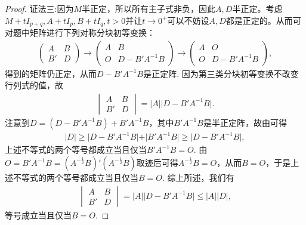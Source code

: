 \documentclass[../../main.tex]{subfiles}%
\begin{document}
\begin{proof}
{\color{blue}证法三:}因为$M$半正定，所以所有主子式非负，因此$A,D$半正定。考虑$M + tI_{p+q}, A + tI_p, B + tI_q, t > 0$并让$t \to 0^+$可以不妨设$A,D$都是正定的。从而可对题中矩阵进行下列对称分块初等变换：
\begin{align*}
\begin{pmatrix}A&B\\B'&D\end{pmatrix}\to\begin{pmatrix}A&B\\O&D - B'A^{-1}B\end{pmatrix}\to\begin{pmatrix}A&O\\O&D - B'A^{-1}B\end{pmatrix},
\end{align*}
得到的矩阵仍正定，从而\(D - B'A^{-1}B\)是正定阵. 因为第三类分块初等变换不改变行列式的值，故
\begin{align*}
\begin{vmatrix}A&B\\B'&D\end{vmatrix}=\vert A\vert\vert D - B'A^{-1}B\vert.
\end{align*}
注意到\(D=(D - B'A^{-1}B)+B'A^{-1}B\)，其中\(B'A^{-1}B\)是半正定阵，故由可得
\begin{align*}
\vert D\vert\geqslant \vert D - B'A^{-1}B\vert+\vert B'A^{-1}B\vert\geqslant \vert D - B'A^{-1}B\vert,
\end{align*}
上述不等式的两个等号都成立当且仅当\(B'A^{-1}B = O\). 由\(O = B'A^{-1}B=(A^{-\frac{1}{2}}B)'(A^{-\frac{1}{2}}B)\)取迹后可得\(A^{-\frac{1}{2}}B = O\)，从而\(B = O\)，于是上述不等式的两个等号都成立当且仅当\(B = O\). 综上所述，我们有
\begin{align*}
\begin{vmatrix}A&B\\B'&D\end{vmatrix}=\vert A\vert\vert D - B'A^{-1}B\vert\leqslant \vert A\vert\vert D\vert,
\end{align*}
等号成立当且仅当\(B = O\). 
\end{proof}
\end{document}
